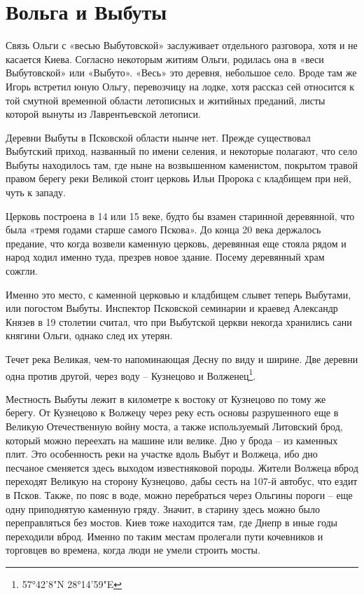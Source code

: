 \chapter{Вольга и Выбуты}

Связь Ольги с «весью Выбутовской» заслуживает отдельного разговора, хотя и не касается Киева. Согласно некоторым житиям Ольги, родилась она в «веси Выбутовской» или «Выбуто». «Весь» это деревня, небольшое село. Вроде там же Игорь встретил юную Ольгу, перевозчицу на лодке, хотя рассказ сей относится к той смутной временной области летописных и житийных преданий, листы которой вынуты из Лаврентьевской летописи. 

Деревни Выбуты в Псковской области нынче нет. Пре\-жде существовал Выбутский приход, названный по имени селения, и некоторые полагают, что село Выбуты находилось там, где ныне на возвышенном каменистом, покрытом травой правом берегу реки Великой стоит церковь Ильи Пророка с кладбищем при ней, чуть к западу.

Церковь построена в 14 или 15 веке, будто бы взамен старинной деревянной, что была «тремя годами старше самого Пскова». До конца 20 века держалось предание, что когда возвели каменную церковь, деревянная еще стояла рядом и народ ходил именно туда, презрев новое здание. Посему деревянный храм сожгли.

Именно это место, с каменной церковью и кладбищем слывет теперь Выбутами, или погостом Выбуты. Инспектор Псковской семинарии и краевед Александр Князев в 19 столетии считал, что при Выбутской церкви некогда хранились сани княгини Ольги, однако след их утерян.

Течет река Великая, чем-то напоминающая Десну по виду и ширине. Две деревни одна против другой, через воду – Кузнецово и Волженец\footnote{57°42'8"N 28°14'59"E}. 

Местность Выбуты лежит в километре к востоку от Кузнецово по тому же берегу. От Кузнецово к Волжецу через реку есть основы разрушенного еще в Великую Отечественную войну моста, а также используемый Литовский брод, который можно переехать на машине или велике. Дно у брода – из каменных плит. Это особенность реки на участке вдоль Выбут и Волжеца, ибо дно песчаное сменяется здесь выходом известняковой породы. Жители Волжеца вброд переходят Великую на сторону Кузнецово, дабы сесть на 107-й автобус, что ездит в Псков. Также, по пояс в воде, можно перебраться через Ольгины пороги – еще одну приподнятую каменную гряду. Значит, в старину здесь можно было переправляться без мостов. Киев тоже находится там, где Днепр в иные годы переходили вброд. Именно по таким местам пролегали пути кочевников и торговцев во времена, когда люди не умели строить мосты. 

